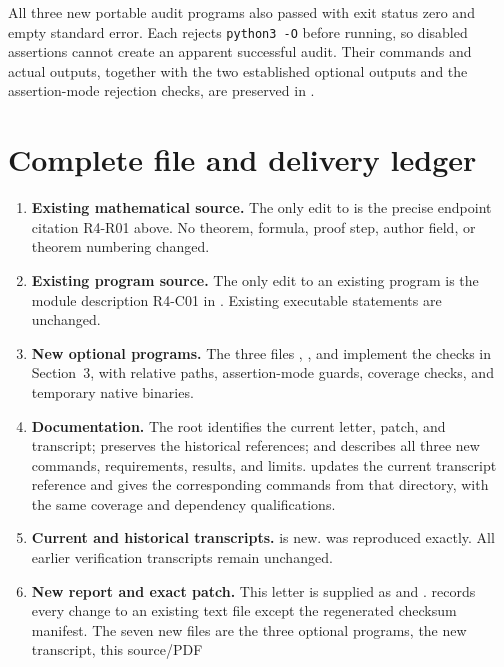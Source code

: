 \documentclass[11pt,a4paper]{article}
\begin{document}
All three new portable audit programs also passed with exit status
zero and empty standard error. Each rejects \texttt{python3 -O}
before running, so disabled assertions cannot create an apparent
successful audit. Their commands and actual outputs, together with
the two established optional outputs and the assertion-mode rejection
checks, are preserved in .

\section{Complete file and delivery ledger}

\begin{enumerate}
\item \textbf{Existing mathematical source.}
The only edit to  is the precise endpoint citation
R4-R01 above. No theorem, formula, proof step, author field, or
theorem numbering changed.
\item \textbf{Existing program source.}
The only edit to an existing program is the module description
R4-C01 in . Existing executable
statements are unchanged.
\item \textbf{New optional programs.}
The three files ,
, and
 implement the checks in
Section~3, with relative paths, assertion-mode guards, coverage
checks, and temporary native binaries.
\item \textbf{Documentation.}
The root  identifies the current letter, patch, and
transcript; preserves the historical references; and describes all
three new commands, requirements, results, and limits.
 updates the current transcript reference
and gives the corresponding commands from that directory, with the
same coverage and dependency qualifications.
\item \textbf{Current and historical transcripts.}
 is new.
 was reproduced exactly. All earlier
verification transcripts remain unchanged.
\item \textbf{New report and exact patch.}
This letter is supplied as  and
.
 records every change to an existing text
file except the regenerated checksum manifest. The seven new files
are the three optional programs, the new transcript, this source/PDF

\end{enumerate}
\end{document}
